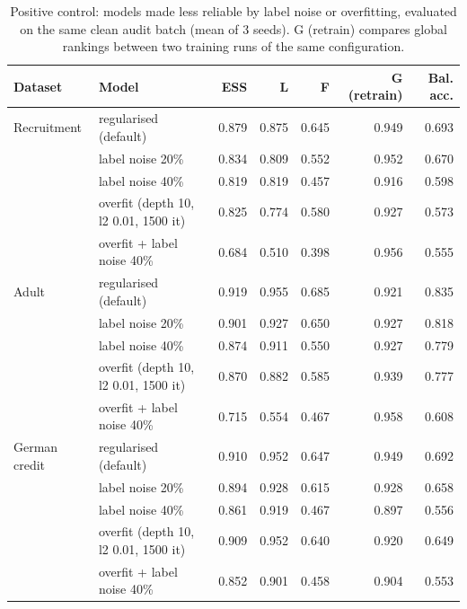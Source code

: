 \begin{table}[t]
\centering
\caption{Positive control: models made less reliable by label noise or overfitting, evaluated on the same clean audit batch (mean of 3 seeds). G (retrain) compares global rankings between two training runs of the same configuration.}
\label{tab:control}
\small
\setlength{\tabcolsep}{4pt}
\begin{tabular}{llrrrrr}
\toprule
Dataset & Model & ESS & L & F & G (retrain) & Bal. acc. \\
\midrule
Recruitment & regularised (default) & 0.879 & 0.875 & 0.645 & 0.949 & 0.693 \\
 & label noise 20\% & 0.834 & 0.809 & 0.552 & 0.952 & 0.670 \\
 & label noise 40\% & 0.819 & 0.819 & 0.457 & 0.916 & 0.598 \\
 & overfit (depth 10, l2 0.01, 1500 it) & 0.825 & 0.774 & 0.580 & 0.927 & 0.573 \\
 & overfit + label noise 40\% & 0.684 & 0.510 & 0.398 & 0.956 & 0.555 \\
Adult & regularised (default) & 0.919 & 0.955 & 0.685 & 0.921 & 0.835 \\
 & label noise 20\% & 0.901 & 0.927 & 0.650 & 0.927 & 0.818 \\
 & label noise 40\% & 0.874 & 0.911 & 0.550 & 0.927 & 0.779 \\
 & overfit (depth 10, l2 0.01, 1500 it) & 0.870 & 0.882 & 0.585 & 0.939 & 0.777 \\
 & overfit + label noise 40\% & 0.715 & 0.554 & 0.467 & 0.958 & 0.608 \\
German credit & regularised (default) & 0.910 & 0.952 & 0.647 & 0.949 & 0.692 \\
 & label noise 20\% & 0.894 & 0.928 & 0.615 & 0.928 & 0.658 \\
 & label noise 40\% & 0.861 & 0.919 & 0.467 & 0.897 & 0.556 \\
 & overfit (depth 10, l2 0.01, 1500 it) & 0.909 & 0.952 & 0.640 & 0.920 & 0.649 \\
 & overfit + label noise 40\% & 0.852 & 0.901 & 0.458 & 0.904 & 0.553 \\
\bottomrule
\end{tabular}
\end{table}
